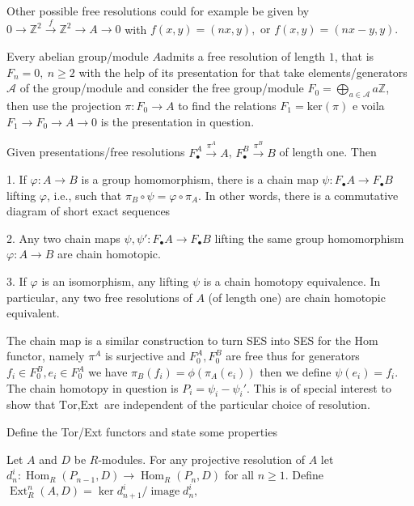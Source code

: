 Other possible free resolutions could for example be given by 
\(0 \longrightarrow \mathbb{Z}^2 \xrightarrow{f} \mathbb{Z}^2 \longrightarrow A \longrightarrow 0\) with
\(f(x,y) = (nx, y), \text{ or } f(x, y) = (nx-y, y).\)

Every abelian group/module \( A  \)admits a free resolution of length \( 1 \), that is \( F_n = 0,\ n \geq 2 \) with the help of
its presentation for that take elements/generators \( \mathcal{A} \) of the group/module and consider the free group/module 
\( F_0 = \bigoplus_{a \in \mathcal{A}} a\mathbb{Z} \), then use the projection \( \pi : F_0 \to A \) to find the relations \( F_1 = \text{ker}(\pi) \)
e voila \( F_1 \to F_0 \to A \to 0 \) is the presentation in question.

Given presentations/free resolutions \( F^A_{\bullet} \xrightarrow{\pi^A} A \), \( F^B_{\bullet} \xrightarrow{\pi^B} B \) of length one. Then


1. If \(\varphi : A \to B\) is a group homomorphism, there is a chain map \(\psi : F_\bullet A \to F_\bullet B\) lifting \(\varphi\), 
i.e., such that \(\pi_B \circ \psi = \varphi \circ \pi_A\). In other words, there is a commutative diagram of short exact sequences

2. Any two chain maps \(\psi, \psi' : F_\bullet A \to F_\bullet B\) lifting the same group homomorphism \(\varphi : A \to B\) are chain homotopic. 

3. If \(\varphi\) is an isomorphism, any lifting \(\psi\) is a chain homotopy equivalence. In particular, any two free resolutions of \(A\) (of length one) are chain homotopic equivalent.

The chain map is a similar construction to turn SES into SES for the \( \text{Hom} \) functor, namely  \( \pi^A \) is surjective and 
\( F^A_0, F^B_0 \) are free thus for generators \(f_i \in F^B_0, e_i \in F^A_0 \) we have \( \pi_B(f_i) = \phi(\pi_A(e_i)) \) then we define 
\( \psi(e_i) = f_i \). The chain homotopy in question is \( P_i = \psi_i - \psi_i' \).
This is of special interest to show that \( \text{Tor}, \text{Ext} \) are independent of the particular choice of resolution.

Define the Tor/Ext functors and state some properties

Let \(A\) and \(D\) be \(R\)-modules. For any projective resolution of \(A\)
let 
\(
d_n^i : \operatorname{Hom}_R(P_{n-1}, D) \to \operatorname{Hom}_R(P_n, D)
\)
for all \(n \geq 1\). Define
\(
\operatorname{Ext}_R^n(A, D) = \ker d_{n+1}^i / \operatorname{image} d_n^i,
\)

